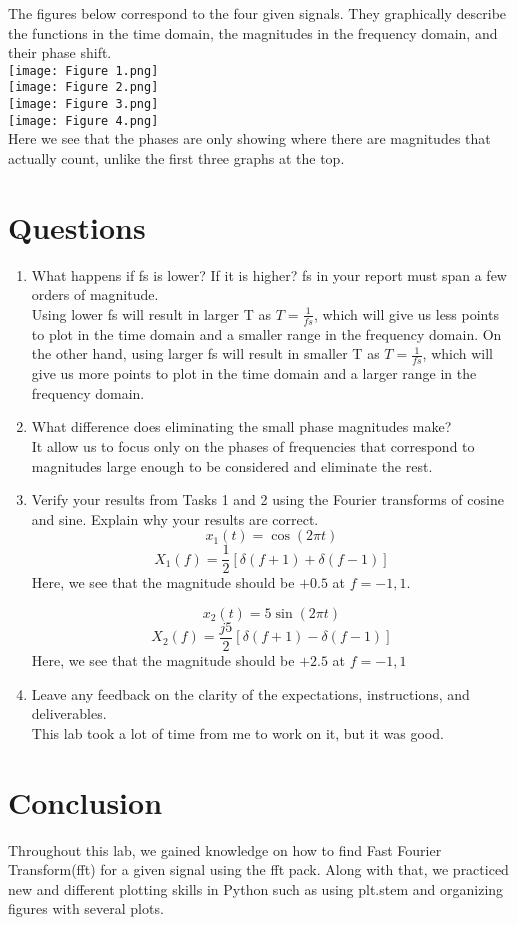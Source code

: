 \documentclass[12pt]{report}
\begin{document}
The figures below correspond to the four given signals. They graphically describe the functions in the time domain, the magnitudes in the frequency domain, and their phase shift.\\
\texttt{[image: Figure 1.png]}\\
\texttt{[image: Figure 2.png]}\\
\texttt{[image: Figure 3.png]}\\
\texttt{[image: Figure 4.png]}\\
Here we see that the phases are only showing where there are magnitudes that actually count, unlike the first three graphs at the top.

\section{Questions}

\begin{enumerate}
    \item 
    What happens if fs is lower? If it is higher? fs in your report must span a few orders of magnitude.\\
    Using lower fs will result in larger T as $T=\frac{1}{fs}$, which will give us less points to plot in the time domain and a smaller range in the frequency domain. On the other hand, using larger fs will result in smaller T as $T=\frac{1}{fs}$, which will give us more points to plot in the time domain and a larger range in the frequency domain.\\
    
    \item
    What difference does eliminating the small phase magnitudes make?\\
    It allow us to focus only on the phases of frequencies that correspond to magnitudes large enough to be considered and eliminate the rest.\\
    
    \item
    Verify your results from Tasks 1 and 2 using the Fourier transforms of cosine and sine. Explain why your results are correct.\\
    $$x_1(t) = \cos{(2\pi t)}$$
    $$X_1(f) = \frac{1}{2}[\delta(f+1) + \delta(f-1)]$$
    Here, we see that the magnitude should be $+0.5$ at $f=-1,1$. 
    
    $$x_2(t) = 5\sin{(2\pi t)}$$
    $$X_2(f) = \frac{j5}{2}[\delta(f+1) - \delta(f-1)]$$
    Here, we see that the magnitude should be $+2.5$ at $f=-1,1$\\
    
    \item
    Leave any feedback on the clarity of the expectations, instructions, and deliverables.\\
   This lab took a lot of time from me to work on it, but it was good. 
\end{enumerate}

\section{Conclusion}
Throughout this lab, we gained knowledge on how to find Fast Fourier Transform(fft) for a given signal using the fft pack. Along with that, we practiced new and different plotting skills in Python such as using plt.stem and organizing figures with several plots.
\end{document}
